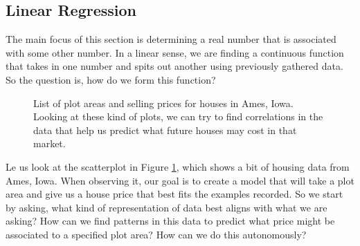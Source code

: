 \subsection{Linear Regression}


The main focus of this section is determining a real number
that is associated with some other number. In a linear sense, we are finding
a continuous function that takes in one number and spits out another using
previously gathered data. So the question is, how do we form this function?


\begin{figure}[t!]
\centering
    \caption{List of plot areas and selling prices for houses in Ames, Iowa.
    Looking at these kind of plots, we can try to find correlations in the data
    that help us predict what future houses may cost in that market.}
    \label{fig:hp}
\end{figure}

Le us look at the scatterplot in Figure \ref{fig:hp}, which shows a bit of housing data from Ames,
Iowa. When observing it, our goal is to create a model that will take a plot area and give us a house price that best fits the examples recorded. So we start by asking, what kind of representation of data best aligns with what we are asking? How can we find patterns in this data to predict what price might be associated to a specified plot area? How can we do this autonomously?

